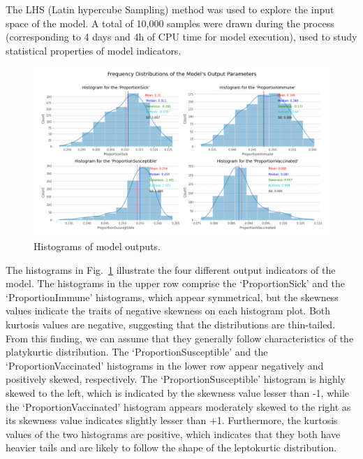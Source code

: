 \documentclass[smallextended]{svjour3}       %
\begin{document}
The LHS (Latin hypercube Sampling) method was used to explore the input space of the model. A total of 10,000 samples were drawn during the process (corresponding to 4 days and 4h of CPU time for model execution), used to study statistical properties of model indicators.



\begin{figure}
	\centering
	\includegraphics[width=0.6\linewidth]{figures/histograms.png}
	\caption{Histograms of model outputs.\label{fig:histograms}}
\end{figure}

The histograms in Fig.~\ref{fig:histograms} illustrate the four different output indicators of the model. The histograms in the upper row comprise the ‘ProportionSick’ and the ‘ProportionImmune’ histograms, which appear symmetrical, but the skewness values indicate the traits of negative skewness on each histogram plot. Both kurtosis values are negative, suggesting that the distributions are thin-tailed. From this finding, we can assume that they generally follow characteristics of the platykurtic distribution. The ‘ProportionSusceptible’ and the ‘ProportionVaccinated’ histograms in the lower row appear negatively and positively skewed, respectively. The ‘ProportionSusceptible’ histogram is highly skewed to the left, which is indicated by the skewness value lesser than -1, while the ‘ProportionVaccinated’ histogram appears moderately skewed to the right as its skewness value indicates slightly lesser than +1. Furthermore, the kurtosis values of the two histograms are positive, which indicates that they both have heavier tails and are likely to follow the shape of the leptokurtic distribution.


\end{document}
